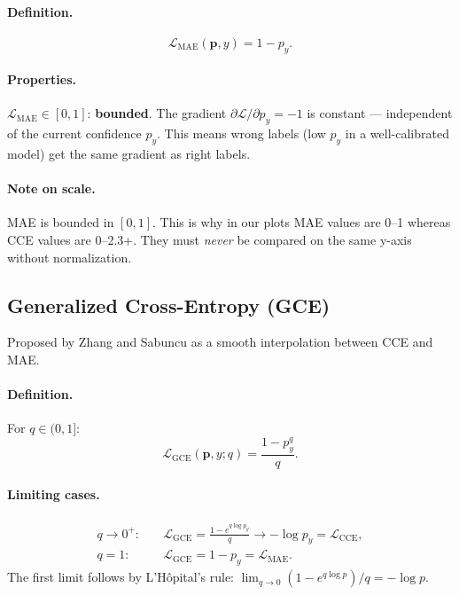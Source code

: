 \documentclass[11pt,a4paper]{article}
\newcommand{\Lcal}{\mathcal{L}}
\newcommand{\py}{p_y}
\newcommand{\pb}{\mathbf{p}}
\begin{document}
\paragraph{Definition.}
\begin{equation}
  \label{eq:mae}
  \Lcal_{\mathrm{MAE}}(\pb, y) = 1 - \py.
\end{equation}

\paragraph{Properties.}
$\Lcal_{\mathrm{MAE}} \in [0,1]$: \textbf{bounded}. The gradient $\partial \Lcal/\partial \py = -1$
is constant — independent of the current confidence $\py$. This means wrong labels
(low $p_y$ in a well-calibrated model) get the same gradient as right labels.

\paragraph{Note on scale.}
MAE is bounded in $[0,1]$. This is why in our plots MAE values are 0--1 whereas
CCE values are 0--2.3+. They must \emph{never} be compared on the same y-axis without normalization.

\subsection{Generalized Cross-Entropy (GCE)}
\label{sec:gce}

Proposed by Zhang and Sabuncu \cite{zhang2018gce} as a smooth interpolation
between CCE and MAE.

\paragraph{Definition.}
For $q \in (0, 1]$:
\begin{equation}
  \label{eq:gce}
  \Lcal_{\mathrm{GCE}}(\pb, y; q) = \frac{1 - \py^q}{q}.
\end{equation}

\paragraph{Limiting cases.}
\begin{align}
  q \to 0^+: \quad & \Lcal_{\mathrm{GCE}} = \frac{1-e^{q\log \py}}{q} \to -\log \py = \Lcal_{\mathrm{CCE}},\\
  q = 1: \quad      & \Lcal_{\mathrm{GCE}} = 1 - p_y = \Lcal_{\mathrm{MAE}}.
\end{align}
The first limit follows by L'Hôpital's rule: $\lim_{q\to 0}(1-e^{q\log p})/q = -\log p$.
\end{document}
